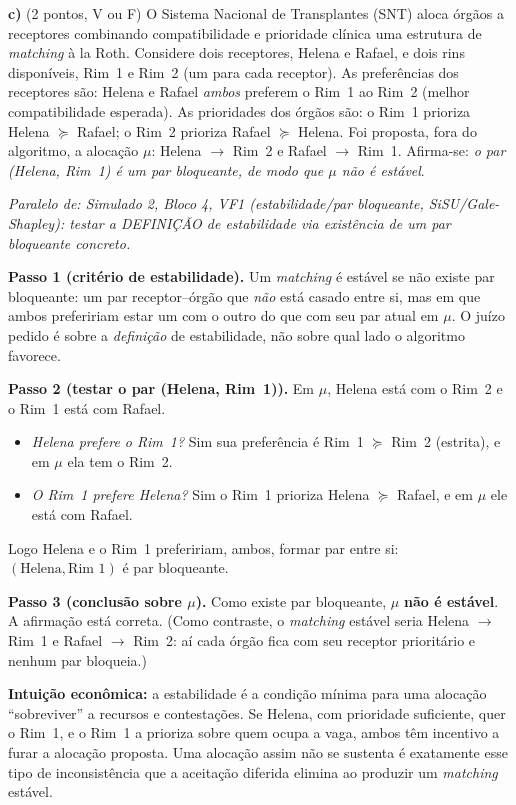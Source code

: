 \textbf{c)} (2 pontos, V ou F) O Sistema Nacional de Transplantes (SNT) aloca \'org\~aos a receptores combinando compatibilidade e prioridade cl\'inica \textemdash{} uma estrutura de \emph{matching} \`a la Roth. Considere dois receptores, Helena e Rafael, e dois rins dispon\'iveis, Rim~1 e Rim~2 (um para cada receptor). As prefer\^encias dos receptores s\~ao: Helena e Rafael \emph{ambos} preferem o Rim~1 ao Rim~2 (melhor compatibilidade esperada). As prioridades dos \'org\~aos s\~ao: o Rim~1 prioriza Helena $\succeq$ Rafael; o Rim~2 prioriza Rafael $\succeq$ Helena. Foi proposta, fora do algoritmo, a aloca\c{c}\~ao $\mu$: Helena $\to$ Rim~2 e Rafael $\to$ Rim~1. Afirma-se: \emph{o par (Helena, Rim~1) \'e um par bloqueante, de modo que $\mu$ n\~ao \'e est\'avel}.

\begin{solucao}
{\footnotesize\textit{Paralelo de: Simulado 2, Bloco 4, VF1 (estabilidade/par bloqueante, SiSU/Gale-Shapley): testar a DEFINIÇÃO de estabilidade via existência de um par bloqueante concreto.}}\par\vspace{0.2em}
\textbf{Passo 1 (crit\'erio de estabilidade).} Um \emph{matching} \'e est\'avel se n\~ao existe par bloqueante: um par receptor--\'org\~ao que \emph{n\~ao} est\'a casado entre si, mas em que ambos prefeririam estar um com o outro do que com seu par atual em $\mu$. O ju\'izo pedido \'e sobre a \emph{defini\c{c}\~ao} de estabilidade, n\~ao sobre qual lado o algoritmo favorece.

\textbf{Passo 2 (testar o par (Helena, Rim~1)).} Em $\mu$, Helena est\'a com o Rim~2 e o Rim~1 est\'a com Rafael.
\begin{itemize}
\item \emph{Helena prefere o Rim~1?} Sim \textemdash{} sua prefer\^encia \'e Rim~1 $\succeq$ Rim~2 (estrita), e em $\mu$ ela tem o Rim~2.
\item \emph{O Rim~1 prefere Helena?} Sim \textemdash{} o Rim~1 prioriza Helena $\succeq$ Rafael, e em $\mu$ ele est\'a com Rafael.
\end{itemize}
Logo Helena e o Rim~1 prefeririam, ambos, formar par entre si: $(\text{Helena},\text{Rim~1})$ \'e par bloqueante.

\textbf{Passo 3 (conclus\~ao sobre $\mu$).} Como existe par bloqueante, $\mu$ \textbf{n\~ao \'e est\'avel}. A afirma\c{c}\~ao est\'a correta. (Como contraste, o \emph{matching} est\'avel seria Helena $\to$ Rim~1 e Rafael $\to$ Rim~2: a\'i cada \'org\~ao fica com seu receptor priorit\'ario e nenhum par bloqueia.)

\textbf{Intui\c{c}\~ao econ\^omica:} a estabilidade \'e a condi\c{c}\~ao m\'inima para uma aloca\c{c}\~ao ``sobreviver'' a recursos e contesta\c{c}\~oes. Se Helena, com prioridade suficiente, quer o Rim~1, e o Rim~1 a prioriza sobre quem ocupa a vaga, ambos t\^em incentivo a furar a aloca\c{c}\~ao proposta. Uma aloca\c{c}\~ao assim n\~ao se sustenta \textemdash{} \'e exatamente esse tipo de inconsist\^encia que a aceita\c{c}\~ao diferida elimina ao produzir um \emph{matching} est\'avel.
\end{solucao}

